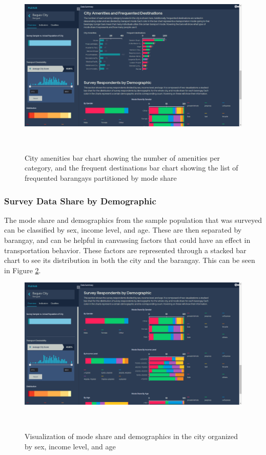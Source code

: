 \documentclass{sigchi}
\begin{document}
\begin{figure}
\centering
  \includegraphics[width=0.9\columnwidth]{figures/overview-dscityam.PNG}
  \caption{City amenities bar chart showing the number of amenities per category, and the frequent destinations bar chart showing the list of frequented barangays partitioned by mode share}~\label{fig:KeplerAmenitiyModeShare}
\end{figure}

\subsubsection{Survey Data Share by Demographic}
The mode share and demographics from the sample population that was surveyed can be classified by sex, income level, and age. These are then separated by barangay, and can be helpful in canvassing factors that could have an effect in transportation behavior. These factors are represented through a stacked bar chart to see its distribution in both the city and the barangay. This can be seen in Figure \ref{fig:KeplerSurveyShare}.

\begin{figure}
\centering
  \includegraphics[width=0.9\columnwidth]{figures/overview-dsdemo.PNG}
  \caption{Visualization of mode share and demographics in the city organized by sex, income level, and age}~\label{fig:KeplerSurveyShare}
\end{figure}
\end{document}

